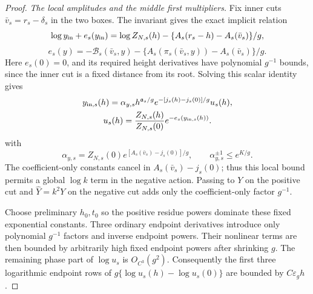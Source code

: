 \begin{proof}
\emph{The local amplitudes and the middle first multipliers.}
Fix inner cuts \(\bar v_s=r_s-\delta_s\) in the two boxes.
The invariant gives the exact implicit relation
\[
 \log y_{\rm in}+e_s(y_{\rm in})
 =\log Z_{N,s}(h)-\{A_s(r_s-h)-A_s(\bar v_s)\}/g,
\]
\[
 e_s(y)=-\mathcal B_s(\bar v_s,y)
 -\{A_s(\pi_s(\bar v_s,y))-A_s(\bar v_s)\}/g .
\]
Here \(e_s(0)=0\), and its required height derivatives have
polynomial \(g^{-1}\) bounds, since the inner cut is a fixed
distance from its root. Solving this scalar identity gives
\begin{equation}
 \begin{gathered}
 y_{{\rm in},s}(h)=\alpha_{y,s}h^{\mathfrak a_s/g}
 e^{-[j_s(h)-j_s(0)]/g}u_s(h),\\
 u_s(h)=\frac{Z_{N,s}(h)}{Z_{N,s}(0)}
 e^{-e_s(y_{{\rm in},s}(h))}.
 \end{gathered}
 \label{deg:joint-root-local-pure-residue}
\end{equation}
with
\[
 \alpha_{y,s}=Z_{N,s}(0)
 e^{[A_s(\bar v_s)-j_s(0)]/g},\qquad
 \alpha_{y,s}^{\pm1}\le e^{K/g}.
\]
The coefficient-only constants cancel in
\(A_s(\bar v_s)-j_s(0)\); thus this local bound permits a
global \(\log k\) term in the negative action. Passing to \(Y\)
on the positive cut and \(\widehat Y=k^2Y\) on the negative cut
adds only the coefficient-only factor \(g^{-1}\).

Choose preliminary \(h_0,t_0\) so the positive residue powers dominate these
fixed exponential constants. Three ordinary endpoint derivatives
introduce only polynomial \(g^{-1}\) factors and inverse endpoint
powers. Their nonlinear terms are then bounded by arbitrarily high
fixed endpoint powers after shrinking \(g\). The remaining phase
part of \(\log u_s\) is \(O_{C^3}(g^2)\).
Consequently the first three logarithmic endpoint rows of
\(g\{\log u_s(h)-\log u_s(0)\}\) are bounded by
\(C\varepsilon_gh\).


\end{proof}
